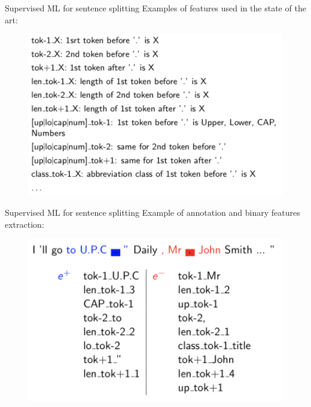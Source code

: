\begin{frame}[containsverbatim]{Supervised ML for sentence splitting}
    Examples of features used in the state of the art:
    \begin{figure}
        \centering
        \includegraphics[width=\linewidth]{img/s1.png}
    \end{figure}
\end{frame}

\begin{frame}[containsverbatim]{Supervised ML for sentence splitting}
    Example of annotation and binary features extraction:
    \begin{figure}
        \centering
        \includegraphics[width=0.9\linewidth]{img/s2.png}
    \end{figure}
\end{frame}

